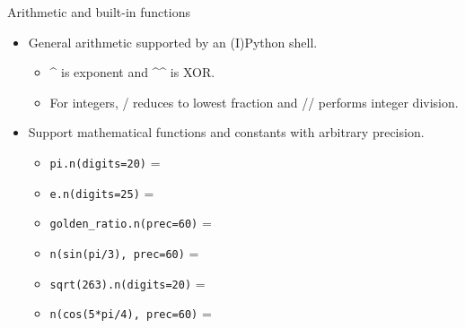 \documentclass{beamer}
\begin{document}
\begin{frame}[fragile]{Arithmetic and built-in functions}
  \begin{itemize}
   \item General arithmetic supported by an (I)Python shell.
   \begin{itemize}
    \item \textasciicircum \hspace{0pt} is exponent and \textasciicircum\textasciicircum \hspace{0pt} is XOR.
    \item For integers, / reduces to lowest fraction and // performs integer division.
   \end{itemize}
   \item Support mathematical functions and constants with arbitrary precision.
   \begin{itemize}
    \item \verb+pi.n(digits=20)+ = 
    \item \verb+e.n(digits=25)+ = 
    \item \verb+golden_ratio.n(prec=60)+ = 
    \item \verb+n(sin(pi/3), prec=60)+ = 
    \item \verb+sqrt(263).n(digits=20)+ = 
    \item \verb+n(cos(5*pi/4), prec=60)+ = 
   \end{itemize}
  \end{itemize}
\end{frame}
\end{document}
